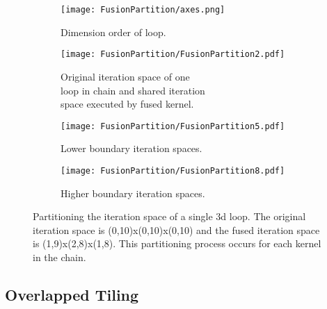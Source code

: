 \begin{figure}
	\captionsetup[subfigure]{justification=centering}
		\centering
		\begin{subfigure}[t]{0.33\textwidth}
			\centering
			\texttt{[image: FusionPartition/axes.png]}
			\caption{Dimension order of loop.}
		\end{subfigure}
		
		
		\begin{subfigure}[t]{0.33\textwidth}
			\centering
			\texttt{[image: FusionPartition/FusionPartition2.pdf]}
			\caption{Original iteration space of one \\ loop in chain and shared iteration \\ space executed by fused kernel.}
			\label{sharedSpace}
		\end{subfigure}
	
		\begin{subfigure}[t]{0.33\textwidth}
			\centering
			\texttt{[image: FusionPartition/FusionPartition5.pdf]}
			\caption{Lower boundary iteration spaces.}
			\label{preshare}
		\end{subfigure}
	
		\begin{subfigure}[t]{0.33\textwidth}
			\centering
			\texttt{[image: FusionPartition/FusionPartition8.pdf]}
			\caption{Higher boundary iteration spaces.}
			\label{postshare}
		\end{subfigure}
	\caption{Partitioning the iteration space of a single 3d loop. The original iteration space is (0,10)x(0,10)x(0,10) and the fused iteration space is (1,9)x(2,8)x(1,8). This partitioning process occurs for each kernel in the chain.}
	\label{fusionPartition}
	\end{figure}
	


	\subsection{Overlapped Tiling}

